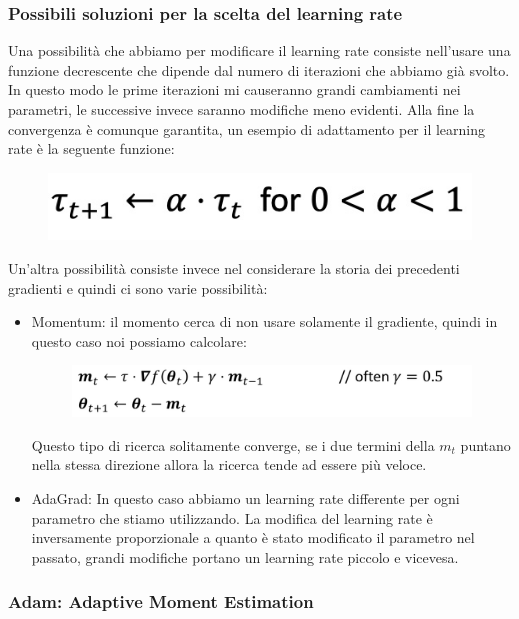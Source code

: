 \documentclass[14pt]{extreport}
\begin{document}
\subsubsection{Possibili soluzioni per la scelta del learning rate}


Una possibilità che abbiamo per modificare il learning rate consiste nell'usare una funzione decrescente che dipende dal numero di iterazioni che
abbiamo già svolto. In questo modo le prime iterazioni mi causeranno grandi cambiamenti nei parametri, le successive invece saranno modifiche meno
evidenti. Alla fine la convergenza è comunque garantita, un esempio di adattamento per il learning rate è la seguente funzione:

\begin{figure}[H]
	\centering
	\includegraphics[width=0.4\linewidth]{249.jpeg}
\end{figure}

Un'altra possibilità consiste invece nel considerare la storia dei precedenti gradienti e quindi ci sono varie possibilità:

\begin{itemize}
	\item Momentum: il momento cerca di non usare solamente il gradiente, quindi in questo caso noi possiamo calcolare: \begin{figure}[H]
		      \centering
		      \includegraphics[width=0.7\linewidth]{250.jpeg}
	      \end{figure}
	      Questo tipo di ricerca solitamente converge, se i due termini della $m_t$ puntano nella stessa direzione allora la ricerca tende ad essere
	      più veloce.

	\item AdaGrad: In questo caso abbiamo un learning rate differente per ogni parametro che stiamo utilizzando. La modifica del learning rate è
	      inversamente proporzionale a quanto è stato modificato il parametro nel passato, grandi modifiche portano un learning rate piccolo e
	      vicevesa.
\end{itemize}

\subsubsection{Adam: Adaptive Moment Estimation}
\end{document}
